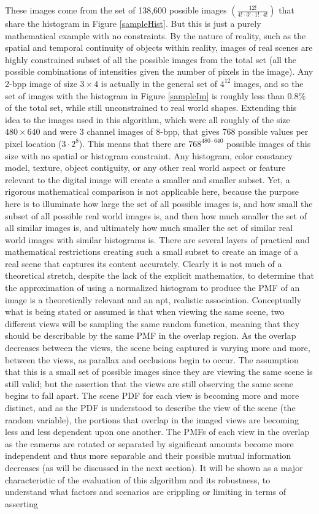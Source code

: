These images come from the set of 138,600 possible images $\left(\frac{12!}{4!\cdot3!\cdot1!\cdot4!}\right)$ that share the histogram in Figure \ref{sampleHist}. But this is just a purely mathematical example with no constraints. By the nature of reality, such as the spatial and temporal continuity of objects within reality, images of real scenes are highly constrained subset of all the possible images from the total set (all the possible combinations of intensities given the number of pixels in the image). Any 2-bpp image of size $3\times4$ is actually in the general set of $4^{12}$ images, and so the set of images with the histogram in Figure \ref{sampleIm} is roughly less than $0.8\%$ of the total set, while still unconstrained to real world shapes. Extending this idea to the images used in this algorithm, which were all roughly of the size $480 \times 640$ and were 3 channel images of 8-bpp, that gives 768 possible values per pixel location ($3\cdot2^{8}$). This means that there are $768^{480\cdot640}$ possible images of this size with no spatial or histogram constraint. Any histogram, color constancy model, texture, object contiguity, or any other real world aspect or feature relevant to the digital image will create a smaller and smaller subset. Yet, a rigorous mathematical comparison is not applicable here, because the purpose here is to illuminate how large the set of all possible images is, and how small the subset of all possible real world images is, and then how much smaller the set of all similar images is, and ultimately how much smaller the set of similar real world images with similar histograms is. There are several layers of practical and mathematical restrictions creating such a small subset to create an image of a real scene that captures its content accurately. Clearly it is not much of a theoretical stretch, despite the lack of the explicit mathematics, to determine that the approximation of using a normalized histogram to produce the PMF of an image is a theoretically relevant and an apt, realistic association. Conceptually what is being stated or assumed is that when viewing the same scene, two different views will be sampling the same random function, meaning that they should be describable by the same PMF in the overlap region. As the overlap decreases between the views, the scene being captured is varying more and more, between the views, as parallax and occlusions begin to occur. The assumption that this is a small set of possible images since they are viewing the same scene is still valid; but the assertion that the views are still observing the same scene begins to fall apart. The scene PDF for each view is becoming more and more distinct, and as the PDF is understood to describe the view of the scene (the random variable), the portions that overlap in the imaged views are becoming less and less dependent upon one another. The PMFs of each view in the overlap as the cameras are rotated or separated by significant amounts become more independent and thus more separable and their possible mutual information decreases (as will be discussed in the next section). It will be shown as a major characteristic of the evaluation of this algorithm and its robustness, to understand what factors and scenarios are crippling or limiting in terms of asserting 